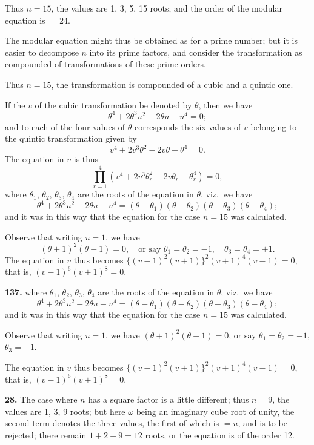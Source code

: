 \documentclass[11pt,a4paper]{article}
\theoremstyle{plain}
\begin{document}
Thus $n = 15$, the values are 1, 3, 5, 15 roots; and the order of the modular equation is $= 24$.

The modular equation might thus be obtained as for a prime number; but it is easier to decompose $n$ into its prime factors, and consider the transformation as compounded of transformations of these prime orders.

Thus $n = 15$, the transformation is compounded of a cubic and a quintic one.

If the $v$ of the cubic transformation be denoted by $\theta$, then we have
\[
\theta^4 + 2\theta^3u^2 - 2\theta u - u^4 = 0;
\]
and to each of the four values of $\theta$ corresponds the six values of $v$ belonging to the quintic transformation given by
\[
v^4 + 2v^3\theta^2 - 2v\theta - \theta^4 = 0.
\]
The equation in $v$ is thus
\[
\prod_{r=1}^{4}(v^4 + 2v^3\theta_r^2 - 2v\theta_r - \theta_r^4) = 0,
\]
where $\theta_1$, $\theta_2$, $\theta_3$, $\theta_4$ are the roots of the equation in $\theta$, viz.\ we have
\[
\theta^4 + 2\theta^3u^2 - 2\theta u - u^4 = (\theta - \theta_1)(\theta - \theta_2)(\theta - \theta_3)(\theta - \theta_4);
\]
and it was in this way that the equation for the case $n = 15$ was calculated.

Observe that writing $u = 1$, we have
\[
(\theta + 1)^2(\theta - 1) = 0, \quad \text{or say } \theta_1 = \theta_2 = -1, \quad \theta_3 = \theta_4 = +1.
\]
The equation in $v$ thus becomes $\{(v - 1)^2(v + 1)\}^2(v + 1)^4(v - 1) = 0$, that is, $(v - 1)^6(v + 1)^8 = 0$.


\noindent\textbf{137.} where $\theta_1$, $\theta_2$, $\theta_3$, $\theta_4$ are the roots of the equation in $\theta$, viz.\ we have
\[
\theta^4 + 2\theta^3u^2 - 2\theta u - u^4 = (\theta - \theta_1)(\theta - \theta_2)(\theta - \theta_3)(\theta - \theta_4);
\]
and it was in this way that the equation for the case $n = 15$ was calculated.

Observe that writing $u = 1$, we have $(\theta + 1)^2(\theta - 1) = 0$, or say $\theta_1 = \theta_2 = -1$, $\theta_3 = +1$.

The equation in $v$ thus becomes $\{(v - 1)^2(v + 1)\}^2(v + 1)^4(v - 1) = 0$, that is, $(v - 1)^6(v + 1)^8 = 0$.

\medskip
\noindent\textbf{28.} The case where $n$ has a square factor is a little different; thus $n = 9$, the values are 1, 3, 9 roots; but here $\omega$ being an imaginary cube root of unity, the second term denotes the three values, the first of which is $= u$, and is to be rejected; there remain $1 + 2 + 9 = 12$ roots, or the equation is of the order 12.
\end{document}
